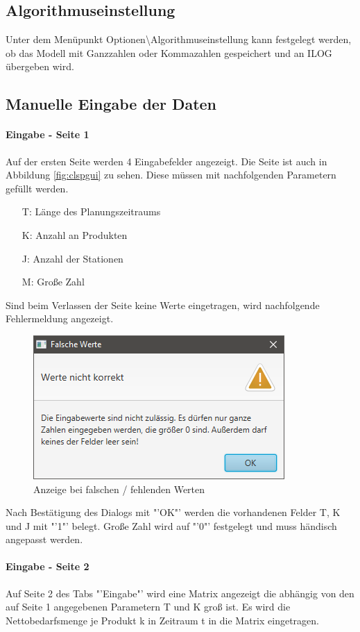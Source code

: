 \documentclass[12pt,a4paper, listof=entryprefix, bibliography=totocnumbered,toc=listofnumbered,lof=listofnumbered]{scrartcl}
\begin{document}
\subsection{Algorithmuseinstellung}
Unter dem Menüpunkt Optionen\textbackslash Algorithmuseinstellung kann festgelegt werden, ob das Modell mit Ganzzahlen oder Kommazahlen gespeichert und an ILOG übergeben wird.

\subsection{Manuelle Eingabe der Daten}

\paragraph{Eingabe - Seite 1}
Auf der ersten Seite werden 4 Eingabefelder angezeigt. Die Seite ist auch in Abbildung \ref{fig:clspgui} zu sehen. Diese müssen mit nachfolgenden Parametern gefüllt werden.

\begin{itemize}
	\item[T:] Länge des Planungszeitraums
	\item[K:] Anzahl an Produkten
	\item[J:] Anzahl der Stationen
	\item[M:] Große Zahl
\end{itemize}

Sind beim Verlassen der Seite keine Werte eingetragen, wird nachfolgende Fehlermeldung angezeigt.

\begin{figure}[H]
	\centering
	\includegraphics[width=.5\linewidth]{images/falscheWerte.png} 
	\caption{Anzeige bei falschen / fehlenden Werten}
	\label{fig:falscheWerte}
\end{figure}

Nach Bestätigung des Dialogs mit "'OK"' werden die vorhandenen Felder T, K und J mit "'1"' belegt. Große Zahl wird auf "'0"' festgelegt und muss händisch angepasst werden.

\paragraph{Eingabe - Seite 2}
Auf Seite 2 des Tabs "'Eingabe"' wird eine Matrix angezeigt die abhängig von den auf Seite 1 angegebenen Parametern T und K groß ist. Es wird die Nettobedarfsmenge je Produkt k in Zeitraum t in die Matrix eingetragen.
\end{document}
